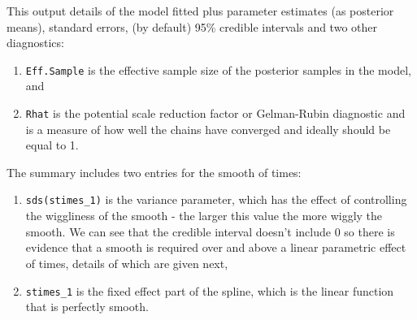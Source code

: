 \documentclass[]{book}
\newenvironment{Shaded}{\begin{snugshade}}{\end{snugshade}}
\newcommand{\CommentTok}[1]{\textcolor[rgb]{0.56,0.35,0.01}{\textit{#1}}}
\newcommand{\KeywordTok}[1]{\textcolor[rgb]{0.13,0.29,0.53}{\textbf{#1}}}
\newcommand{\NormalTok}[1]{#1}
\providecommand{\tightlist}{%
  \setlength{\itemsep}{0pt}\setlength{\parskip}{0pt}}
\begin{document}
\begin{Shaded}
\end{Shaded}

This output details of the model fitted plus parameter estimates (as posterior means), standard errors, (by default) 95\% credible intervals and two other diagnostics:

\begin{enumerate}
\def\labelenumi{\arabic{enumi}.}
\tightlist
\item
  \texttt{Eff.Sample} is the effective sample size of the posterior samples in the model, and
\item
  \texttt{Rhat} is the potential scale reduction factor or Gelman-Rubin diagnostic and is a measure of how well the chains have converged and ideally should be equal to 1.
\end{enumerate}

The summary includes two entries for the smooth of times:

\begin{enumerate}
\def\labelenumi{\arabic{enumi}.}
\tightlist
\item
  \texttt{sds(stimes\_1)} is the variance parameter, which has the effect of controlling the wiggliness of the smooth - the larger this value the more wiggly the smooth. We can see that the credible interval doesn't include 0 so there is evidence that a smooth is required over and above a linear parametric effect of times, details of which are given next,
\item
  \texttt{stimes\_1} is the fixed effect part of the spline, which is the linear function that is perfectly smooth.
\end{enumerate}
\end{document}
